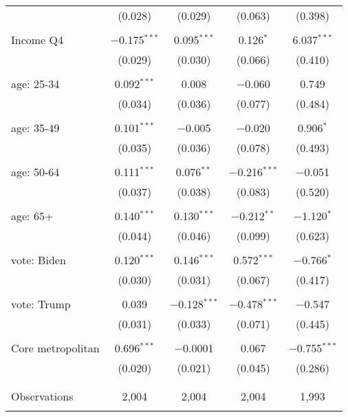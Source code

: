 \begin{tabular}{@{\extracolsep{5pt}}lcccc}
  & (0.028) & (0.029) & (0.063) & (0.398) \\ 
  & & & & \\ 
 Income Q4 & $-$0.175$^{***}$ & 0.095$^{***}$ & 0.126$^{*}$ & 6.037$^{***}$ \\ 
  & (0.029) & (0.030) & (0.066) & (0.410) \\ 
  & & & & \\ 
 age: 25-34 & 0.092$^{***}$ & 0.008 & $-$0.060 & 0.749 \\ 
  & (0.034) & (0.036) & (0.077) & (0.484) \\ 
  & & & & \\ 
 age: 35-49 & 0.101$^{***}$ & $-$0.005 & $-$0.020 & 0.906$^{*}$ \\ 
  & (0.035) & (0.036) & (0.078) & (0.493) \\ 
  & & & & \\ 
 age: 50-64 & 0.111$^{***}$ & 0.076$^{**}$ & $-$0.216$^{***}$ & $-$0.051 \\ 
  & (0.037) & (0.038) & (0.083) & (0.520) \\ 
  & & & & \\ 
 age: 65+ & 0.140$^{***}$ & 0.130$^{***}$ & $-$0.212$^{**}$ & $-$1.120$^{*}$ \\ 
  & (0.044) & (0.046) & (0.099) & (0.623) \\ 
  & & & & \\ 
 vote: Biden & 0.120$^{***}$ & 0.146$^{***}$ & 0.572$^{***}$ & $-$0.766$^{*}$ \\ 
  & (0.030) & (0.031) & (0.067) & (0.417) \\ 
  & & & & \\ 
 vote: Trump & 0.039 & $-$0.128$^{***}$ & $-$0.478$^{***}$ & $-$0.547 \\ 
  & (0.031) & (0.033) & (0.071) & (0.445) \\ 
  & & & & \\ 
 Core metropolitan & 0.696$^{***}$ & $-$0.0001 & 0.067 & $-$0.755$^{***}$ \\ 
  & (0.020) & (0.021) & (0.045) & (0.286) \\ 
  & & & & \\ 
\hline \\[-1.8ex] 

Observations & 2,004 & 2,004 & 2,004 & 1,993 \\ 
\hline 
\hline \\[-1.8ex] 
\end{tabular} 